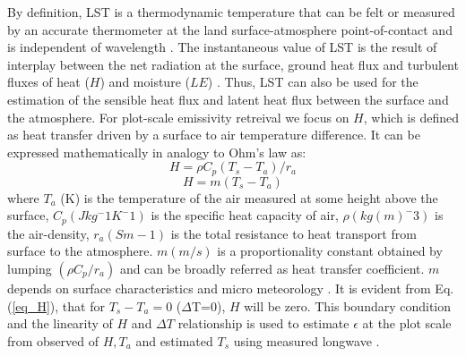\documentclass[fleqn,10pt]{wlscirep}
\begin{document}
By definition, LST is a thermodynamic temperature that can be felt or measured by an accurate thermometer at the land surface-atmosphere point-of-contact and is independent of wavelength \cite{guillevic2017land}. The instantaneous value of LST is the result of interplay between the net radiation at the surface, ground heat flux and turbulent fluxes of heat ($H$) and moisture ($LE$) \cite{wang_global_2013-2}. Thus, LST can also be used for the estimation of the sensible heat flux \cite{sun1995relationship} and latent heat flux \cite{jacob2001comprehensive} between the surface and the atmosphere. For plot-scale emissivity retreival we focus on $H$, which is defined as heat transfer driven by a surface to air temperature difference. It can be expressed mathematically in analogy to Ohm's law as:
\begin{equation}\label{eq_H1}
H= \rho C_{p}(T_{s} - T_{a})/r_{a}
\end{equation}
\begin{equation}\label{eq_H}
H= m(T_{s} - T_{a})
\end{equation}
where $T_{a}$ (K) is the temperature of the air measured at some height above the surface, $C_{p} (J kg^-1 K^-1)$ is the specific heat capacity of air, $\rho (kg (m)^-3)$ is the air-density, $r_{a}(S m-1)$ is the total resistance to heat transport from surface to the atmosphere. $m (m/s)$ is a proportionality constant obtained by lumping $(\rho C_{p}/r_{a})$ and can be broadly referred as heat transfer coefficient. $m$ depends on surface characteristics and micro meteorology \cite{lhomme_radiative_1988}. It is evident from Eq. (\ref{eq_H}), that for $T_{s} - T_{a} = 0 $ ($\Delta$T=0), $H$ will be zero. This boundary condition and the linearity of $H$ and $\Delta T $ relationship is used to estimate $\epsilon$ at the plot scale from observed of $H,T_a$ and estimated $T_{s}$ using measured longwave \cite{holmes_land_2009,holmes_cloud_2016-1,maes2019potential}. %
\end{document}
